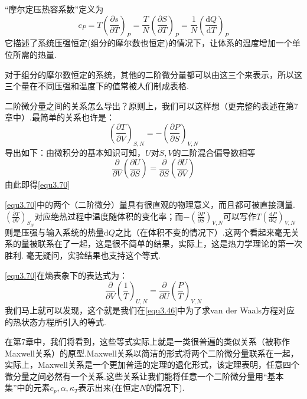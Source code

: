 “摩尔定压热容系数”定义为
\begin{equation}
\label{equ3.69}
c_P=T\left(\frac{\partial s}{\partial T}\right)_P=\frac{T}{N}\left(\frac{\partial S}{\partial T}\right)_P=\frac{1}{N}\left(\frac{\text{d}Q}{\text{d}T}\right)_P
\end{equation}
它描述了系统压强恒定(组分的摩尔数也恒定)的情况下，让体系的温度增加一个单位所需的热量.

对于组分的摩尔数恒定的系统，其他的二阶微分量都可以由这三个来表示，所以这三个量在不同压强和温度下的值常被人们制成表格.

二阶微分量之间的关系怎么导出？原则上，我们可以这样想（更完整的表述在第7章中）.最简单的关系也许是：
\begin{equation}
\label{equ3.70}
\left(\frac{\partial T}{\partial V}\right)_{S,N}=-\left(\frac{\partial P}{\partial S}\right)_{V,N}
\end{equation}
导出如下：由微积分的基本知识可知，$U$对$S,V$的二阶混合偏导数相等
\begin{equation}
\label{3.71}
\frac{\partial}{\partial V}\left(\frac{\partial U}{\partial S}\right)=\frac{\partial}{\partial S}\left(\frac{\partial U}{\partial V}\right)
\end{equation}
由此即得\eqref{equ3.70}

\eqref{equ3.70}中的两个（二阶微分）量具有很直观的物理意义，而且都可被直接测量. $\left(\frac{\partial T}{\partial V}\right)_{S_N}$对应绝热过程中温度随体积的变化率；而$-\left(\frac{\partial P}{\partial S}\right)_{V,N}$可以写作$T\left(\frac{\text{d} P}{\text{d} Q}\right)_{V,N}$则是压强与输入系统的热量$\text{d}Q$之比（在体积不变的情况下）.这两个看起来毫无关系的量被联系在了一起，这是很不简单的结果，实际上，这是热力学理论的第一次胜利. 毫无疑问，实验结果也支持这个等式.

\eqref{equ3.70}在熵表象下的表达式为：
\begin{equation}
\label{equ3.72}
\frac{\partial }{\partial V}\left(\frac{1}{T}\right)_{U,N}=\frac{\partial }{\partial U}\left(\frac{P}{T}\right)_{V,N}
\end{equation}
我们马上就可以发现，这个就是我们在\eqref{equ3.46}中为了求van der Waals方程对应的热状态方程所引入的等式.

在第7章中，我们将看到，这些等式实际上就是一类很普遍的类似关系（被称作Maxwell关系）的原型.Maxwell关系以简洁的形式将两个二阶微分量联系在一起，实际上，Maxwell关系是一个更加普适的定理的退化形式，该定理表明，任意四个微分量之间必然有一个关系.这些关系让我们能将任意一个二阶微分量用“基本集”中的元素$c_p,\alpha,\kappa_T$表示出来(在恒定$N$的情况下).


